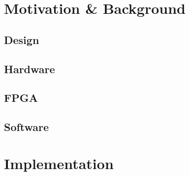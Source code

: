 \documentclass[letterpaper,12pt]{article}
\begin{document}
\section{Motivation \& Background}

\subsection{Design}


\subsection{Hardware} %
\subsection{FPGA} %
\subsection{Software} %

\section{Implementation}
\end{document}
